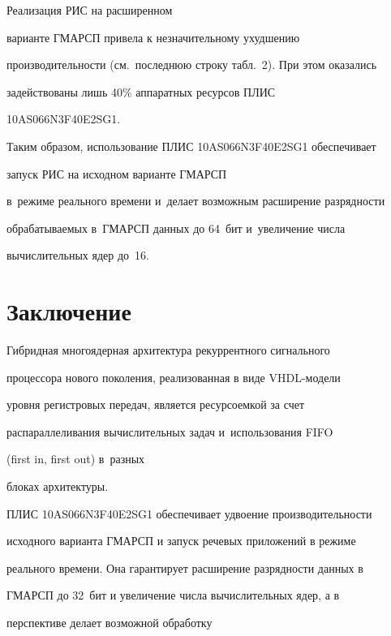   

  

  Реализация РИС на расширенном 

варианте \mbox{ГМАРСП} привела к незначительному ухудшению 

производительности (см.\ последнюю строку табл.~2). При этом оказались 

задействованы лишь 40\% аппаратных ресурсов ПЛИС 

10AS066N3F40E2SG1. 

  

  Таким образом, использование ПЛИС 10AS066N3F40E2SG1 обеспечивает 

запуск РИС на исходном варианте ГМАРСП 

в~режиме реального времени и~делает возможным расширение разрядности 

обрабатываемых в~\mbox{ГМАРСП} данных до 64~бит и~увеличение числа 

вычислительных ядер до~16.

  

\vspace*{-3pt}



\section{Заключение}



  Гибридная многоядерная архитектура рекуррентного сигнального

процессора нового поколения, реализованная в виде VHDL-мо\-де\-ли 

уровня регистровых передач, является ресурсоемкой за счет 

распараллеливания вы\-чис\-ли\-тель\-ных задач и~использования FIFO 

(first in, first out) в~разных 

блоках архитектуры.

  

  ПЛИС 10AS066N3F40E2SG1 обеспечивает удвоение производительности 

исходного варианта ГМАРСП и запуск речевых приложений в режиме 

реального времени. Она гарантирует расширение разрядности данных в 

ГМАРСП до 32~бит и увеличение числа вычислительных ядер, а в 

перспективе делает возможной обработку  

